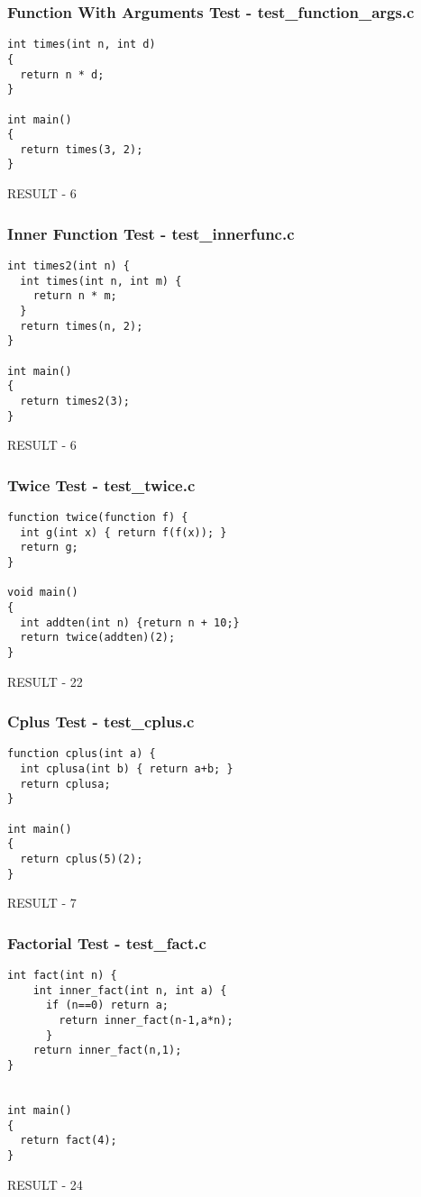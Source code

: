 \documentclass{article}
\begin{document}
\subsubsection{Function With Arguments Test - test\_function\_args.c}
\begin{lstlisting}
int times(int n, int d)
{
  return n * d;
}

int main()
{
  return times(3, 2);
}
\end{lstlisting}
RESULT - 6

\subsubsection{Inner Function Test - test\_innerfunc.c}
\begin{lstlisting}
int times2(int n) {
  int times(int n, int m) {
    return n * m;
  }
  return times(n, 2);
}

int main()
{
  return times2(3);
}
\end{lstlisting}
RESULT - 6

\subsubsection{Twice Test - test\_twice.c}
\begin{lstlisting}
function twice(function f) {
  int g(int x) { return f(f(x)); }
  return g;
}

void main()
{
  int addten(int n) {return n + 10;}
  return twice(addten)(2);
}
\end{lstlisting}
RESULT - 22

\subsubsection{Cplus Test - test\_cplus.c}
\begin{lstlisting}
function cplus(int a) {
  int cplusa(int b) { return a+b; }
  return cplusa;
}

int main()
{
  return cplus(5)(2);
}
\end{lstlisting}
RESULT - 7

\subsubsection{Factorial Test - test\_fact.c}
\begin{lstlisting}
int fact(int n) {
    int inner_fact(int n, int a) {
      if (n==0) return a;
        return inner_fact(n-1,a*n);
      }
    return inner_fact(n,1);
}


int main()
{
  return fact(4);
}
\end{lstlisting}
RESULT - 24
\end{document}
